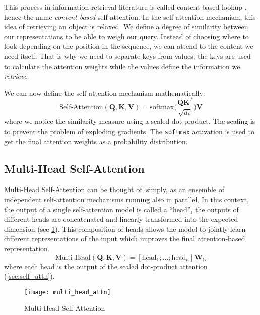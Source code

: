 This process in information retrieval literature is called content-based lookup \citep{mitra2000information}, hence the name \textit{content-based} self-attention. In the self-attention mechanism, this idea of retrieving an object is relaxed. We define a degree of similarity between our representations to be able to weigh our query. Instead of choosing where to look depending on the position in the sequence, we can attend to the content we need itself. That is why we need to separate keys from values; the keys are used to calculate the attention weights while the values define the information we \textit{retrieve}.

We can now define the self-attention mechanism mathematically:
\[ \text{Self-Attention}(\mathbf{Q}, \mathbf{K}, \mathbf{V}) = \text{softmax} \Big(\frac{\mathbf{Q} \mathbf{K}^T}{\sqrt{d_k}}\Big) \mathbf{V} \]
where we notice the similarity measure using a scaled dot-product. The scaling is to prevent the problem of exploding gradients. The \texttt{softmax} activation is used to get the final attention weights as a probability distribution.


\subsection{Multi-Head Self-Attention}
\label{sec:multihead_attn}

Multi-Head Self-Attention \citep{vaswani2017attention} can be thought of, simply, as an ensemble of independent self-attention mechanisms running also in parallel. In this context, the output of a single self-attention model is called a ``head'', the outputs of different heads are concatenated and linearly transformed into the expected dimension (see \cref{fig:multi_head_attn}). This composition of heads allows the model to jointly learn different representations of the input which improves the final attention-based representation.
\[ \text{Multi-Head} (\mathbf{Q}, \mathbf{K}, \mathbf{V}) = [\text{head}_1; \ldots; \text{head}_n] \mathbf{W}_O \]
where each head is the output of the scaled dot-product attention (\cref{sec:self_attn}).

\begin{figure}[ht]
\centering
\texttt{[image: multi\_head\_attn]}
\caption{Multi-Head Self-Attention \protect\footnotemark}
\label{fig:multi_head_attn}
\end{figure}



